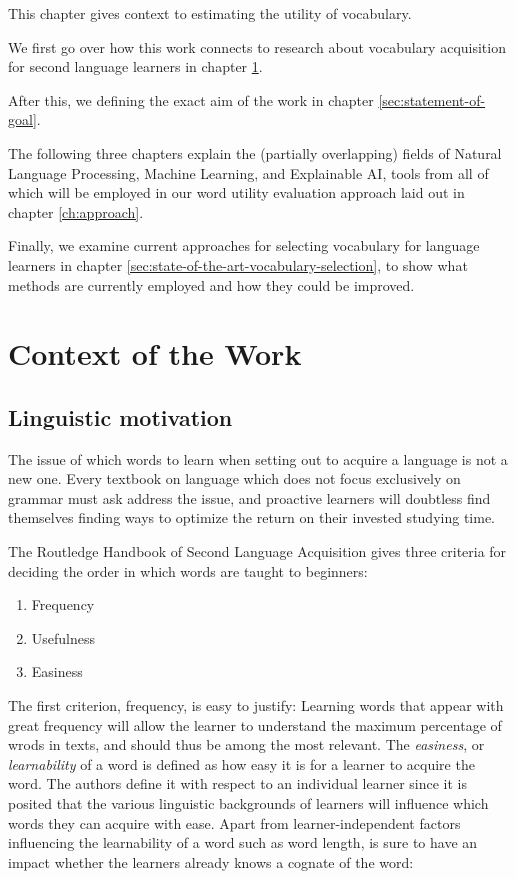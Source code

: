 This chapter gives context to estimating the utility of vocabulary.

We first go over how this work connects to research about vocabulary acquisition for second language learners in chapter \ref{sec:context-of-work}.

After this, we defining the exact aim of the work in chapter \ref{sec:statement-of-goal}.

The following three chapters explain the (partially overlapping) fields of Natural Language Processing, Machine Learning, and Explainable AI, tools from all of which will be employed in our word utility evaluation approach laid out in chapter \ref{ch:approach}.

Finally, we examine current approaches for selecting vocabulary for language learners in chapter \ref{sec:state-of-the-art-vocabulary-selection}, to show what methods are currently employed and how they could be improved.


\section{Context of the Work} \label{sec:context-of-work}

\subsection{Linguistic motivation}
The issue of which words to learn when setting out to acquire a language is not a new one.
Every textbook on language which does not focus exclusively on grammar must ask address the issue, and proactive learners will doubtless find themselves finding ways to optimize the return on their invested studying time.

The Routledge Handbook of Second Language Acquisition  gives three criteria for deciding the order in which words are taught to beginners:
\begin{enumerate}
	\item Frequency
	\item Usefulness
	\item Easiness
\end{enumerate}
The first criterion, frequency, is easy to justify:
Learning words that appear with great frequency will allow the learner to understand the maximum percentage of wrods in texts, and should thus be among the most relevant.
The \textit{easiness}, or \textit{learnability} of a word is defined as how easy it is for a learner to acquire the word.
The authors define it with respect to an individual learner since it is posited that the various linguistic backgrounds of learners will influence which words they can acquire with ease.
Apart from learner-independent factors influencing the learnability of a word such as word length, is sure to have an impact whether the learners already knows a cognate of the word:

